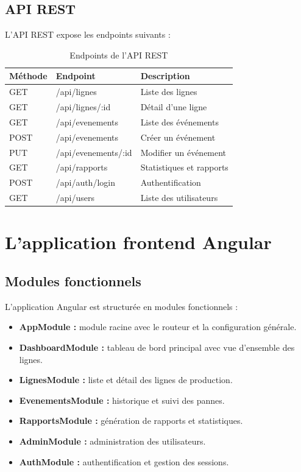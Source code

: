 \subsection{API REST}

L'API REST expose les endpoints suivants :

\begin{table}[htbp]
\centering
\renewcommand{\arraystretch}{1.3}
\begin{tabular}{l l l}
\toprule
\textbf{M\'ethode} & \textbf{Endpoint} & \textbf{Description} \\
\midrule
GET & /api/lignes & Liste des lignes \\
GET & /api/lignes/:id & D\'etail d'une ligne \\
GET & /api/evenements & Liste des \'ev\'enements \\
POST & /api/evenements & Cr\'eer un \'ev\'enement \\
PUT & /api/evenements/:id & Modifier un \'ev\'enement \\
GET & /api/rapports & Statistiques et rapports \\
POST & /api/auth/login & Authentification \\
GET & /api/users & Liste des utilisateurs \\
\bottomrule
\end{tabular}
\caption{Endpoints de l'API REST}
\label{tab:api_endpoints}
\end{table}

\section{L'application frontend Angular}

\subsection{Modules fonctionnels}

L'application Angular est structur\'ee en modules fonctionnels :

\begin{itemize}
    \item \textbf{AppModule :} module racine avec le routeur et la configuration g\'en\'erale.
    \item \textbf{DashboardModule :} tableau de bord principal avec vue d'ensemble des lignes.
    \item \textbf{LignesModule :} liste et d\'etail des lignes de production.
    \item \textbf{EvenementsModule :} historique et suivi des pannes.
    \item \textbf{RapportsModule :} g\'en\'eration de rapports et statistiques.
    \item \textbf{AdminModule :} administration des utilisateurs.
    \item \textbf{AuthModule :} authentification et gestion des sessions.
\end{itemize}

